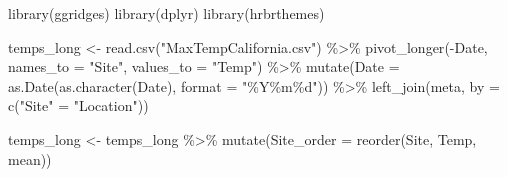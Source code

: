 \documentclass[
  11pt,
]{article}
\newenvironment{Shaded}{\begin{snugshade}}{\end{snugshade}}
\newcommand{\AttributeTok}[1]{\textcolor[rgb]{0.40,0.45,0.13}{#1}}
\newcommand{\FunctionTok}[1]{\textcolor[rgb]{0.28,0.35,0.67}{#1}}
\newcommand{\NormalTok}[1]{\textcolor[rgb]{0.00,0.23,0.31}{#1}}
\newcommand{\OtherTok}[1]{\textcolor[rgb]{0.00,0.23,0.31}{#1}}
\newcommand{\SpecialCharTok}[1]{\textcolor[rgb]{0.37,0.37,0.37}{#1}}
\newcommand{\StringTok}[1]{\textcolor[rgb]{0.13,0.47,0.30}{#1}}
\begin{document}
\begin{Shaded}
\begin{Highlighting}[]
\FunctionTok{library}\NormalTok{(ggridges)}
\FunctionTok{library}\NormalTok{(dplyr)}
\FunctionTok{library}\NormalTok{(hrbrthemes)}

\NormalTok{temps\_long }\OtherTok{\textless{}{-}} \FunctionTok{read.csv}\NormalTok{(}\StringTok{"MaxTempCalifornia.csv"}\NormalTok{) }\SpecialCharTok{\%\textgreater{}\%}
  \FunctionTok{pivot\_longer}\NormalTok{(}\SpecialCharTok{{-}}\NormalTok{Date, }\AttributeTok{names\_to =} \StringTok{"Site"}\NormalTok{, }\AttributeTok{values\_to =} \StringTok{"Temp"}\NormalTok{) }\SpecialCharTok{\%\textgreater{}\%}
  \FunctionTok{mutate}\NormalTok{(}\AttributeTok{Date =} \FunctionTok{as.Date}\NormalTok{(}\FunctionTok{as.character}\NormalTok{(Date), }\AttributeTok{format =} \StringTok{"\%Y\%m\%d"}\NormalTok{)) }\SpecialCharTok{\%\textgreater{}\%}
  \FunctionTok{left\_join}\NormalTok{(meta, }\AttributeTok{by =} \FunctionTok{c}\NormalTok{(}\StringTok{"Site"} \OtherTok{=} \StringTok{"Location"}\NormalTok{))}

\NormalTok{temps\_long }\OtherTok{\textless{}{-}}\NormalTok{ temps\_long }\SpecialCharTok{\%\textgreater{}\%}
  \FunctionTok{mutate}\NormalTok{(}\AttributeTok{Site\_order =} \FunctionTok{reorder}\NormalTok{(Site, Temp, mean))}



\end{Highlighting}
\end{Shaded}
\end{document}
